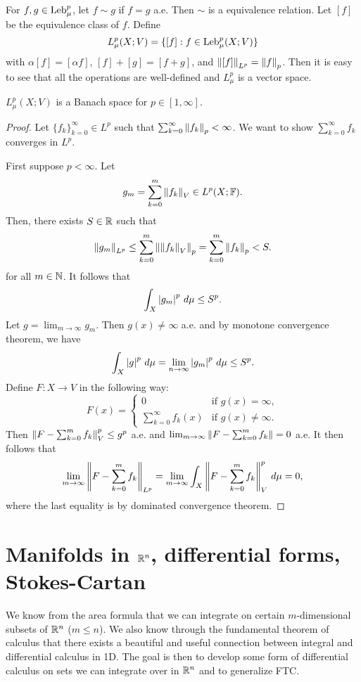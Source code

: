 \documentclass[a4paper]{article}
\renewcommand{\suminfk}{\sum_{k=0}^\infty}
\renewcommand{\seqinfk}[1]{\{ #1 \}_{k=0}^\infty}
\renewcommand{\sumk}{\sum_{k=0}}
\begin{document}
\begin{defi}[$L^p$ spaces]
For $f, g \in \operatorname{Leb}_\mu^p$, let $f \sim g$ if
$f = g$ a.e. Then $\sim$ is a equivalence relation.
Let $[f]$ be the equivalence class of $f$. Define
\[
L^p_\mu (X; V) = \{[f] : f \in \operatorname{Leb}_\mu^p (X; V)\}
\]
with $\alpha [f] = [\alpha f]$, $[f] + [g] = [f + g]$,
and $\left\lVert [f]\right\rVert_{L^p} = \left\lVert f\right\rVert_p$. Then it is easy to see
that all the operations are well-defined and $L^p_\mu$ is
a vector space.
\end{defi}

\begin{thm}
$L^p_\mu(X; V)$ is a Banach space for $p \in [1, \infty]$.
\end{thm}

\begin{proof}
Let $\seqinfk{f_k} \in L^p$ such that $\suminfk \norm{f_k}_p
< \infty$. We want to show $\suminfk f_k$ converges in $L^p$.

First suppose $p < \infty$. Let
\[
g_m = \sumk^m \norm{f_k}_V \in L^p(X; \F).
\]
Then, there exists $S \in \mathbb{R}$ such that
\[
\norm{g_m}_{L^p} \leq \sumk^m \norm{\norm{f_k}_V}_p
= \sumk^m \norm{f_k}_p < S.
\]
for all $m \in \mathbb{N}$. It follows that
\[
\int_X \left\lvert g_m\right\rvert^p \, d \mu \leq S^p.
\]
Let $g = \lim_{m \to \infty} g_m$. Then
$g(x) \neq \infty$ a.e. and by monotone convergence theorem,
we have
\[
\int_X \left\lvert g\right\rvert^p \, d \mu = \lim_{n \to \infty}
\left\lvert g_m\right\rvert^p \, d \mu \leq S^p.
\]
Define $F: X \to V$ in the following way:
\[
F(x) = \begin{cases}
  0 & \text{if $g(x) = \infty$}, \\
  \suminfk f_k(x) & \text{if $g(x) \neq \infty$}.
\end{cases}
\]
Then $\norm{F - \sumk^m f_k}_V^p \leq g^p$ a.e.
and $\lim_{m \to \infty} \norm{F - \sumk^m f_k} = 0$ a.e.
It then follows that
\[
\lim_{m \to \infty} \norm{F - \sumk^m f_k}_{L^p}
= \lim_{m \to \infty} \int_X \norm{F - \sumk^m f_k}^p_V \d \mu
= 0,
\]
where the last equality is by dominated convergence
theorem.
\end{proof}





\section{Manifolds in $\mathbb{R}^n$, differential forms,
Stokes-Cartan}

We know from the area formula that we can integrate on
certain $m$-dimensional subsets of $\mathbb{R}^n$ ($m \leq n$).
We also know through the fundamental theorem of calculus that
there exists a beautiful and useful connection between
integral and differential calculus in 1D. The goal is then
to develop some form of differential calculus on sets we can
integrate over in $\mathbb{R}^n$ and to generalize FTC.
\end{document}
